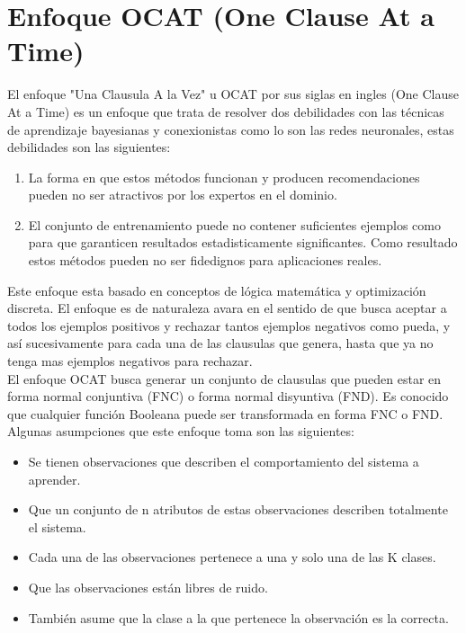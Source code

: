 \section{Enfoque OCAT (One Clause At a Time)}

El enfoque "Una Clausula A la Vez" u OCAT por sus siglas en ingles (One Clause At a Time) es un enfoque que trata de resolver dos debilidades con las técnicas de aprendizaje bayesianas y conexionistas como lo son las redes neuronales, estas debilidades son las siguientes:

\begin{enumerate}
	\item La forma en que estos métodos funcionan y producen recomendaciones pueden no ser atractivos por los expertos en el dominio. 
	\item El conjunto de entrenamiento puede no contener suficientes ejemplos como para que garanticen resultados estadisticamente significantes. Como resultado estos métodos pueden no ser fidedignos para aplicaciones reales. 
\end{enumerate}

Este enfoque esta basado en conceptos de lógica matemática y optimización discreta. El enfoque es de naturaleza avara en el sentido de que busca aceptar a todos los ejemplos positivos y rechazar tantos ejemplos negativos como pueda, y así sucesivamente para cada una de las clausulas que genera, hasta que ya no tenga mas ejemplos negativos para rechazar.
\\
El enfoque OCAT busca generar un conjunto de clausulas que pueden estar en forma normal conjuntiva (FNC) o forma normal disyuntiva (FND). Es conocido \citep{peysakh1987fast} que cualquier función Booleana puede ser transformada en forma FNC o FND. 
\\
Algunas asumpciones que este enfoque toma son las siguientes:

\begin{itemize}
	\item Se tienen observaciones que describen el comportamiento del sistema a aprender.
	\item Que un conjunto de n atributos de estas observaciones describen totalmente el sistema.
	\item Cada una de las observaciones pertenece a una y solo una de las K clases.
	\item Que las observaciones están libres de ruido.
	\item También asume que la clase a la que pertenece la observación es la correcta. 
\end{itemize}

